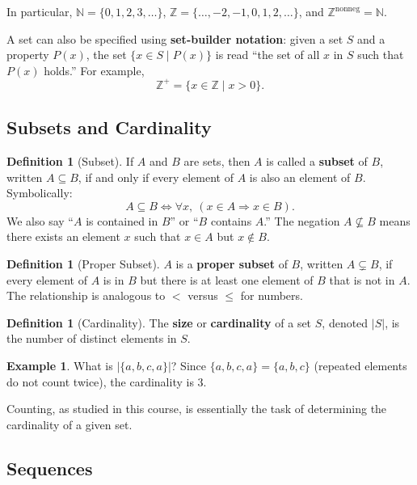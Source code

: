 \documentclass[11pt, a4paper, notitlepage]{report}
\theoremstyle{definition}
\newtheorem{definition}[theorem]{Definition}
\newtheorem{example}[theorem]{Example}
\theoremstyle{remark}
\begin{document}
In particular, $\mathbb{N} = \{0, 1, 2, 3, \ldots\}$, $\mathbb{Z} = \{\ldots, -2, -1, 0, 1, 2, \ldots\}$,
and $\mathbb{Z}^{\text{nonneg}} = \mathbb{N}$.

A set can also be specified using \textbf{set-builder notation}: given a set $S$ and a property
$P(x)$, the set $\{x \in S \mid P(x)\}$ is read ``the set of all $x$ in $S$ such that $P(x)$
holds.'' For example,
\[
  \mathbb{Z}^+ = \{x \in \mathbb{Z} \mid x > 0\}.
\]

\subsection{Subsets and Cardinality}

\begin{definition}[Subset]
\label{def:subset}
If $A$ and $B$ are sets, then $A$ is called a \textbf{subset} of $B$, written $A \subseteq B$,
if and only if every element of $A$ is also an element of $B$. Symbolically:
\[
  A \subseteq B \iff \forall x,\ (x \in A \Rightarrow x \in B).
\]
We also say ``$A$ is contained in $B$'' or ``$B$ contains $A$.'' The negation $A \not\subseteq B$
means there exists an element $x$ such that $x \in A$ but $x \notin B$.
\end{definition}

\begin{definition}[Proper Subset]
$A$ is a \textbf{proper subset} of $B$, written $A \subsetneq B$, if every element of $A$ is
in $B$ but there is at least one element of $B$ that is not in $A$. The relationship is
analogous to $<$ versus $\leq$ for numbers.
\end{definition}

\begin{definition}[Cardinality]
\label{def:cardinality}
The \textbf{size} or \textbf{cardinality} of a set $S$, denoted $|S|$, is the number of
distinct elements in $S$.
\end{definition}

\begin{example}
What is $|\{a, b, c, a\}|$? Since $\{a, b, c, a\} = \{a, b, c\}$ (repeated elements do not
count twice), the cardinality is $3$.
\end{example}

Counting, as studied in this course, is essentially the task of determining the cardinality of
a given set.

\subsection{Sequences}
\end{document}
